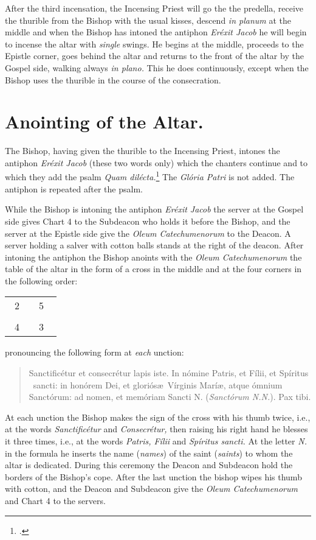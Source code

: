 \documentclass[letterpaper]{report}
\newcommand\crossplan{
\begin{center}
    \begin{tabular}{ | l c r | }
       \hline
        \cross\ {\tiny 2} &         & {\tiny 5} \cross\ \\
                           & \cross &           \\
        \cross\ {\tiny 4} &         & {\tiny 3} \cross\ \\
       \hline
   \end{tabular} 
\end{center}
}
\begin{document}
{    \rubric After the third incensation, the Incensing Priest will go the the
    predella, receive the thurible from the Bishop with the usual kisses,
    descend \textit{in planum} at the middle and when the Bishop has intoned
    the antiphon \textit{Er\'exit Jacob} he will begin to incense the altar
    with \textit{single} swings. He begins at the middle, proceeds to the
    Epistle corner, goes behind the altar and returns to the front of the altar
    by the Gospel side, walking always \textit{in plano.} This he does
    continuously, except when the Bishop uses the thurible in the course of the
    consecration.

    \section{Anointing of the Altar.}

    \rubric The Bishop, having given the thurible to the Incensing Priest,
    intones the antiphon \textit{Er\'exit Jacob} (these two words only) which
    the chanters continue and to which they add the psalm \textit{Quam
    dil\'ecta.}\footcite[][the rubric appplied to psalm 42 above applies here
    as well.]{consecranda} The \textit{Gl\'oria Patri} is not added. The
    antiphon is repeated after the psalm.

    \rubric While the Bishop is intoning the antiphon \textit{Er\'exit Jacob}
    the server at the Gospel side gives Chart 4 to the Subdeacon who holds it
    before the Bishop, and the server at the Epistle side give the
    \textit{Oleum Catechumenorum} to the Deacon. A server holding a salver with
    cotton balls stands at the right of the deacon. After intoning the antiphon
    the Bishop anoints with the \textit{Oleum Catechumenorum} the table of the
    altar in the form of a cross in the middle and at the four corners in the
    following order:

    \crossplan

    pronouncing the following form at \textit{each} unction:

    \begin{quote}
        Sancti\cross ficétur et conse\cross crétur lapis iste. In nómine
        Pa\cross tris, et Fí\cross lii, et Spíritus \cross\ sancti: in honórem
        Dei, et gloriós\ae\ Vírginis Marí\ae, atque ómnium Sanctórum: ad nomen,
        et memóriam Sancti N. (\textit{Sanctórum N.N.}). Pax tibi.
    \end{quote}

    At each unction the Bishop makes the sign of the cross with his thumb
    twice, i.e., at the words \textit{Sanctific\'etur} and
    \textit{Consecr\'etur,} then raising his right hand he blesses it three
    times, i.e., at the words \textit{Patris, F\'ilii} and \textit{Sp\'iritus
    sancti.} At the letter \textit{N.} in the formula he inserts the name
    (\textit{names}) of the saint (\textit{saints}) to whom the altar is
    dedicated. During this ceremony the Deacon and Subdeacon hold the borders
    of the Bishop's cope. After the last unction the bishop wipes his thumb
    with cotton, and the Deacon and Subdeacon give the \textit{Oleum
    Catechumenorum} and Chart 4 to the servers.

}
\end{document}
